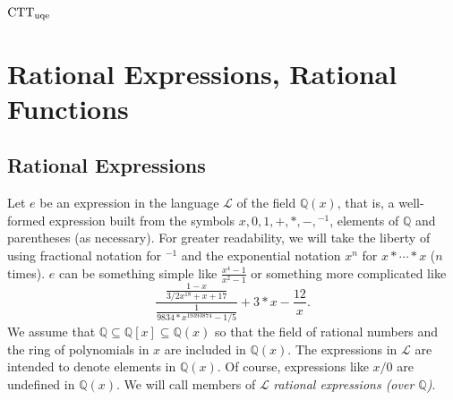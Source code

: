 \documentclass[fleqn]{llncs}
\newcommand{\QQ}{\ensuremath{\mathbb{Q}}}
\newcommand{\NRE}{\ensuremath{\mname{normRatExpr}}}
\newcommand{\Lang}{\ensuremath{\mathcal{L}}}
\begin{document}
\subsection{${\rm CTT}_{\rm uqe}$}

\iffalse
SBMAs can be difficult to specify since they involve an interplay of
syntax and semantics.  We have to be careful of \emph{which} semantics
is used to guide the syntactic manipulations, as different semantics
for the \textbf{same} expression can be inconsistent.

We are thus interested in the following questions:

\be

  \item What should the specification of the computational behavior of
    {\NRE} be?

  \item What is the mathematical meaning of {\NRE} be when {\NRE} is
    applied to the body of a rational function?

  \item What features of a logic are needed to express
    {\NRE}'s specification and mathematical meaning?

  \item What features of a logic would make expressing {\NRE}'s
    specification and mathematical meaning relatively straightforward?

\ee
\fi




\section{Rational Expressions, Rational Functions}

\subsection{Rational Expressions}

Let $e$ be an expression in the language $\Lang$ of the field
$\QQ(x)$, that is, a well-formed expression built from the symbols $x,
0, 1, +, *, -, \phantom{}^{-1}$, elements of $\QQ$ and parentheses (as
necessary).  For greater readability, we will take the liberty of
using fractional notation for $\phantom{}^{-1}$ and the exponential
notation $x^n$ for $x * \cdots * x$ ($n$ times).  $e$ can be something
simple like $\frac{x^4-1}{x^2-1}$ or something more complicated like
\begin{equation*}
\frac{\frac{1-x}{3/2 x^{18} + x + 17}}
     {\frac{1}{9834*x^{19393874}-1/5}}+3*x -\frac{12}{x}.
\end{equation*}
We assume that $\QQ \subseteq \QQ[x] \subseteq \QQ(x)$ so that the
field of rational numbers and the ring of polynomials in $x$ are
included in $\QQ(x)$.  The expressions in $\Lang$ are intended to
denote elements in $\QQ(x)$.  Of course, expressions like $x/0$ are
undefined in $\QQ(x)$.  We will call members of $\Lang$ \emph{rational
  expressions (over $\QQ$)}.
\end{document}
